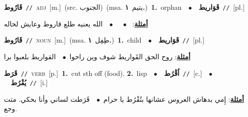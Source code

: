 \documentclass[10pt,a4paper,twoside]{article} %
\begin{document}
\begin{multicols}{2}
{\setlength\topsep{0pt}\textbf{\foreignlanguage{arabic}{قَارُوط}}\ {\color{gray}\texttt{//}\color{black}}\ \textsc{adj}\ [m.]\ (src. \color{gray}\foreignlanguage{arabic}{الجنوب}\color{black})\ \color{gray}(msa. \foreignlanguage{arabic}{يتيم}~\foreignlanguage{arabic}{\textbf{١.}})\color{black}\ \textbf{1.}~orphan\ \ $\bullet$\ \ \setlength\topsep{0pt}\textbf{\foreignlanguage{arabic}{قَوَاريط}}\ {\color{gray}\texttt{//}\color{black}}\ [pl.]\  \begin{flushright}\color{gray}\foreignlanguage{arabic}{\textbf{\underline{\foreignlanguage{arabic}{أمثلة}}}: \ $\bullet$\ \  \ $\bullet$\ \  الله يعنيه طلع قاروط وعايش لحاله}\end{flushright}\color{black}} \vspace{2mm}

{\setlength\topsep{0pt}\textbf{\foreignlanguage{arabic}{قَارُوط}}\ {\color{gray}\texttt{//}\color{black}}\ \textsc{noun}\ [m.]\ \color{gray}(msa. \foreignlanguage{arabic}{طِفِل}~\foreignlanguage{arabic}{\textbf{١.}})\color{black}\ \textbf{1.}~child\ \ $\bullet$\ \ \setlength\topsep{0pt}\textbf{\foreignlanguage{arabic}{قَوَاريط}}\ {\color{gray}\texttt{//}\color{black}}\ [pl.]\  \begin{flushright}\color{gray}\foreignlanguage{arabic}{\textbf{\underline{\foreignlanguage{arabic}{أمثلة}}}: روح الحق القَواريط شوف وين راحوا\ $\bullet$\ \  القواريط بلعبوا برا}\end{flushright}\color{black}} \vspace{2mm}

{\setlength\topsep{0pt}\textbf{\foreignlanguage{arabic}{قَرَط}}\ {\color{gray}\texttt{//}\color{black}}\ \textsc{verb}\ [p.]\ \textbf{1.}~cut sth off (food).  \textbf{2.}~lisp\ \ $\bullet$\ \ \setlength\topsep{0pt}\textbf{\foreignlanguage{arabic}{اُقْرُط}}\ {\color{gray}\texttt{//}\color{black}}\ [c.]\ \ $\bullet$\ \ \setlength\topsep{0pt}\textbf{\foreignlanguage{arabic}{يُقْرُط}}\ {\color{gray}\texttt{//}\color{black}}\ [i.]\  \begin{flushright}\color{gray}\foreignlanguage{arabic}{\textbf{\underline{\foreignlanguage{arabic}{أمثلة}}}: إِمي بدهاش العروس عشانها بتُقْرُط يا حرام\ $\bullet$\ \  قَرَطت لساني وأنا بحكي. متت وجع.}\end{flushright}\color{black}} \vspace{2mm}


\end{multicols}
\end{document}
